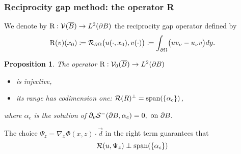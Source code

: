 \documentclass[10pt]{beamer}
\newtheorem{proposition}[subsection]{Proposition}
\theoremstyle{plain}
\theoremstyle{plain}
\begin{document}
\begin{frame}
 \frametitle{Reciprocity gap method: the operator R}
 We denote by $\textup{R} : \mathcal{V}(\overline{B})\to L^2(\partial B)$ the {\color{blue}reciprocity gap operator}
 defined by
\begin{equation}
 \textup{R}(v)(x_0)\coloneqq 
 \mathcal{R}_{\partial\Omega}\bigl(u(\cdot,x_0),v(\cdot)\bigr)
 \coloneqq \int_{\partial \Omega}\bigl(uv_\nu - u_\nu v \bigr)dy.
\end{equation}

 \begin{proposition}
 The operator $\textup{R} : \mathcal{V}_0(\overline{B})\to L^2(\partial B)$
 \begin{itemize}
  \item[-] is injective,
  \item[-] its range has codimension one: $\mathcal{R}(R)^\perp=\textup{span}(\{\alpha_c\})$,
 \end{itemize}
 where $\alpha_c$ is the solution of 
 $
  \partial_\nu \mathcal{S}^-(\partial B,\alpha_c) = 0,\textup{ on }\partial B.
 $
 \end{proposition}
 The choice $\Psi_z=\nabla_x\Phi(x,z)\cdot \vec{d}$ in the right term guarantees that
 \begin{equation*}
  \mathcal{R}(u,\Psi_z) \perp \textup{span}(\{\alpha_c\})
 \end{equation*}

\end{frame}
\end{document}
